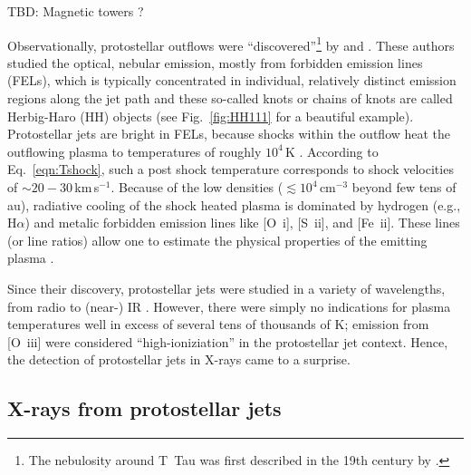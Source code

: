 {\color{red} TBD: Magnetic towers \citep{Huarte_2012}? }

Observationally,  protostellar outflows  were ``discovered''\footnote{The nebulosity around T~Tau was first described in the 19th century  by \citet{Burnham_1890, Burnham_1894}.} by \citet{Herbig_1950,Herbig_1951} and \citet{Haro_1952,Haro_1953}. These authors studied the optical, nebular emission, mostly from forbidden emission lines (FELs), which is typically concentrated in individual, relatively distinct emission regions along the jet path and these so-called knots or chains of knots are called Herbig-Haro (HH) objects (see Fig.~\ref{fig:HH111} for a beautiful example). Protostellar jets are bright in FELs, because shocks within the outflow heat the outflowing plasma to temperatures of roughly $10^4\,$K \citep{}. According to Eq.~\ref{eqn:Tshock}, such a post shock temperature corresponds to shock velocities of $\sim20-30$\,km\,s$^{-1}$.
%
Because of the low densities ($\lesssim10^4\,$cm$^{-3}$ beyond few tens of au), radiative cooling of the shock heated plasma is dominated by hydrogen (e.g., H$\alpha$) and metalic forbidden emission lines like [O~{\sc i}], [S~{\sc ii}], and [Fe~{\sc ii}]. These lines (or line ratios) allow one to estimate the physical properties of the emitting plasma \citep[temperature, density, ionization degree, e.g., ][]{Bacciotti_1999}.

Since their discovery, protostellar jets were studied in a variety of wavelengths, from radio \citep{} to (near-) IR \citep{}. However, there were simply no indications for plasma temperatures well in excess of several tens of thousands of K; emission from [O~{\sc iii}] were considered ``high-ioniziation'' in the protostellar jet context. Hence, the detection of protostellar jets in X-rays came to a surprise.

\subsection{X-rays from protostellar jets}


%
%
%




